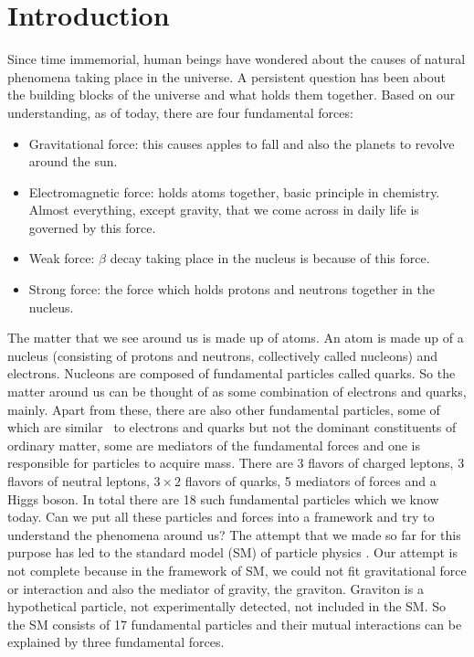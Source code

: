 \chapter{Introduction} %

\label{Chap0}
Since time immemorial, human beings have wondered about the causes of natural phenomena taking place in the universe.
A persistent question has been about the building blocks of the universe and what holds them together.
Based on our understanding, as of today, there are four fundamental forces:
\begin{itemize}
\item Gravitational force: this causes apples to fall and also the planets to revolve around the sun.
\item Electromagnetic force: holds atoms together, basic principle in chemistry. Almost everything, except gravity, that we come across in daily life is governed by this force.
\item Weak force: $\beta$ decay taking place in the nucleus is because of this force.
\item Strong force: the force which holds protons and neutrons together in the nucleus.
\end{itemize}
The matter that we see around us is made up of atoms. An atom is made up of a nucleus (consisting of protons and neutrons, collectively 
called nucleons) and electrons. Nucleons are composed of fundamental particles called quarks. So the matter around us can be thought of as 
some combination of electrons and quarks, mainly. Apart from these, there are also other fundamental particles, some of which are similar \
to electrons and quarks but not the dominant constituents of ordinary matter, some are mediators of the fundamental forces and one
is responsible for particles to acquire mass. There are 3 flavors of charged leptons, 3 flavors of neutral leptons, $3\times2$ flavors of 
quarks, 5 mediators of forces and a Higgs boson. In total there are 18 such fundamental particles which we know today. Can we put all these 
particles and forces into a framework and try to understand the phenomena around us? The attempt that we made so far for this purpose has 
led to the standard model (SM) of particle physics \cite{PhysRevLett.19.1264,RevModPhys.52.525,GLASHOW1961579,Salam:1968rm}. Our attempt is not 
complete because in the framework of SM, we could not fit gravitational force or interaction and also the mediator of gravity, the 
graviton. Graviton is a hypothetical particle, not experimentally detected, not included in the SM. So the SM consists of 17 fundamental 
particles and their mutual interactions can be explained by three fundamental forces.

